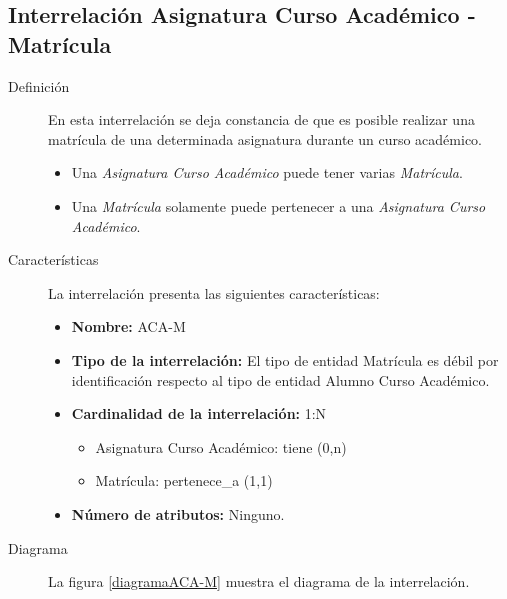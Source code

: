 \subsection{Interrelación Asignatura Curso Académico - Matrícula}

   \begin{description}
      \item[Definición] En esta interrelación se deja constancia de que es
      posible realizar una matrícula de una determinada asignatura durante un
      curso académico.

      \begin{itemize}
       \item Una \textit{Asignatura Curso Académico} puede tener varias
             \textit{Matrícula}.
       \item Una \textit{Matrícula} solamente puede
             pertenecer a una \textit{Asignatura Curso \newline Académico}.
      \end{itemize}

      \item[Características] La interrelación presenta las siguientes
                             características:

         \begin{itemize}
            \item \textbf{Nombre:} ACA-M
            \item \textbf{Tipo de la interrelación:} El tipo de entidad
                  Matrícula es débil por identificación
                  respecto al tipo de entidad Alumno Curso Académico.
            \item \textbf{Cardinalidad de la interrelación:} 1:N
                  \begin{itemize}
                     \item Asignatura Curso Académico: tiene (0,n)
                     \item Matrícula: pertenece\_a (1,1)
                  \end{itemize}
            \item \textbf{Número de atributos:} Ninguno.
         \end{itemize}

      \item[Diagrama] La figura \ref{diagramaACA-M} muestra el diagrama de la
                      interrelación.


\end{description}
